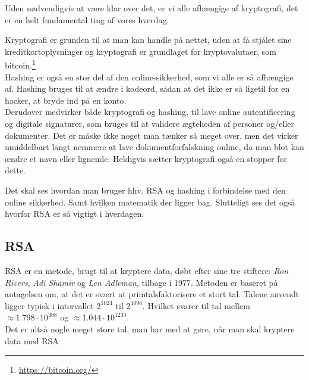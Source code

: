 Uden nødvendigvis at være klar over det, er vi alle afhængige af kryptografi, det er en helt fundamental ting af vores hverdag.

Kryptografi er grunden til at man kan handle på nettet, uden at få stjålet sine kreditkortoplysninger og
kryptografi er grundlaget for kryptovalutaer, som bitcoin.\footnote{\url{https://bitcoin.org/}} \\
Hashing er også en stor del af den online-sikkerhed, som vi alle er så afhængige af.
Hashing bruges til at ændre i kodeord, sådan at det ikke er så ligetil for en hacker, at bryde ind på en konto.\\
Derudover medvirker både kryptografi og hashing, til lave online autentificering og digitale signaturer, som bruges til at validere ægteheden af personer og/eller dokumenter.
Det er måske ikke noget man tænker så meget over, men det virker umiddelbart langt nemmere at lave dokumentforfalskning online, da man blot kan ændre et navn eller lignende. Heldigvis sætter kryptografi også en stopper for dette.
\par
Det skal ses hvordan man bruger hhv. RSA og hashing i forbindelse med den online sikkerhed. Samt hvilken matematik der ligger bag.
Slutteligt ses det også hvorfor RSA er så vigtigt i hverdagen.




\subsection*{RSA}
RSA er en metode, brugt til at kryptere data, døbt efter sine tre stiftere:
\textit{Ron Rivers}, \textit{Adi Shamir} og \textit{Len Adleman}, tilbage i 1977.\cite{algoritmer}
Metoden er baseret på antagelsen om, at det er svært at primtalsfaktorisere et stort tal.
Talene anvendt ligger typisk i intervallet \(2^{1024}\) til \(2^{4096}\).
Hvilket svarer til tal mellem \(\approx 1.798 \cdot 10^{308}\) og \(\approx 1.044 \cdot 10^{1233}\).\\ %
Det er altså nogle meget store tal, man har med at gøre, når man skal kryptere data med RSA
